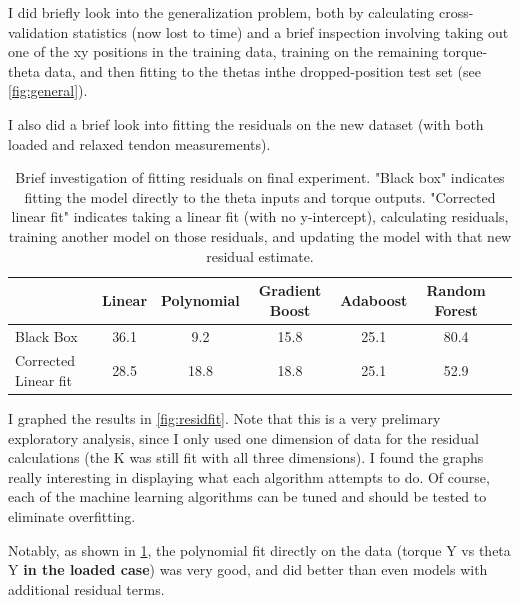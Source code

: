 \documentclass[preprint,12pt,3p]{elsarticle}
\begin{document}
I did briefly look into the generalization problem, both by calculating cross-validation statistics
(now lost to time) and a brief inspection involving taking out one of the xy positions in the training
data, training on the remaining torque-theta data, and then fitting to the thetas inthe  dropped-position test
set (see \cref{fig:general}).

I also did a brief look into fitting the residuals on the new dataset (with both loaded and relaxed
tendon measurements).
\begin{table}[H]
    \centering
    \caption{Brief investigation of fitting residuals on final experiment. "Black box" indicates
    fitting the model directly to the theta inputs and torque outputs. "Corrected linear fit"
    indicates taking a linear fit (with no y-intercept), calculating residuals, training another
    model on those residuals, and updating the model with that new residual estimate.}
\label{tab:residfit}
    \begin{tabular}{l|c|c|c|c|c|c}
         \hline \hline
         &  Linear & Polynomial & Gradient Boost & Adaboost & Random Forest\\
         \hline 
         Black Box          & 36.1 & 9.2 & 15.8 & 25.1 & 80.4 \\ 
         Corrected Linear fit & 28.5 & 18.8 & 18.8 & 25.1 & 52.9 \\
    \hline
    \end{tabular}
\end{table}

I graphed the results in \cref{fig:residfit}. Note that this is a very prelimary exploratory analysis, since I only
used one dimension of data for the residual calculations (the K was still fit with all three
dimensions). I found the graphs really interesting in displaying what each algorithm attempts to do.
Of course, each of the machine learning algorithms can be tuned and should be tested to eliminate
overfitting.  

Notably, as shown in \cref{tab:residfit}, the polynomial fit directly on the data (torque Y vs theta Y \textbf{in the loaded case}) was very good, and did better than even models with additional residual terms.
\end{document}
